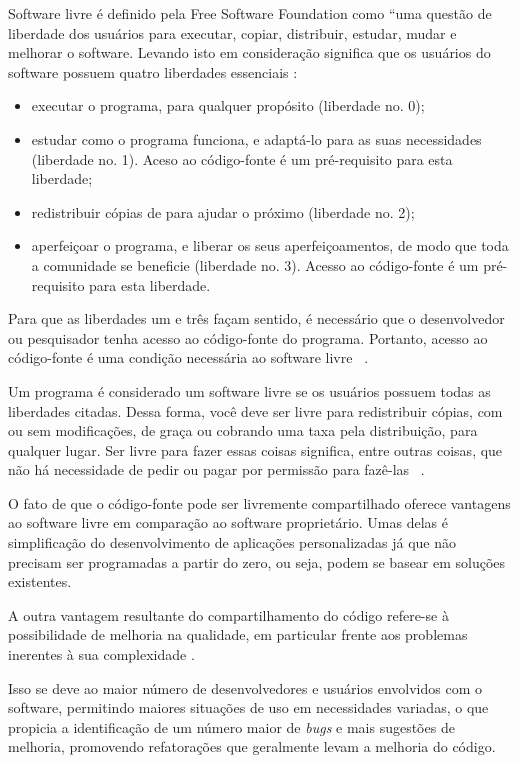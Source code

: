 Software livre é definido pela Free Software Foundation como “uma questão de liberdade dos usuários para executar, copiar, distribuir, estudar, mudar e melhorar o software. Levando isto em consideração significa que os usuários do software possuem quatro liberdades essenciais \cite{stallman2002free}:

\begin{itemize}
\item executar o programa, para qualquer propósito (liberdade no. 0);
\item estudar como o programa funciona, e adaptá-lo para as suas necessidades (liberdade no. 1). Aceso ao código-fonte é um pré-requisito para esta liberdade;
\item redistribuir cópias de para ajudar o próximo (liberdade no. 2);
\item aperfeiçoar o programa, e liberar os seus aperfeiçoamentos, de modo que toda a comunidade se beneficie (liberdade no. 3). Acesso ao código-fonte é um pré-requisito para esta liberdade.
\end{itemize}

Para que as liberdades um e três façam sentido, é necessário que o desenvolvedor ou pesquisador tenha acesso ao código-fonte do programa.  Portanto, acesso ao código-fonte é uma condição necessária ao software livre ~\cite{gnu2013}.

Um programa é considerado um software livre se os usuários possuem todas as liberdades citadas. Dessa forma, você deve ser livre para redistribuir cópias, com ou sem modificações, de graça ou cobrando uma taxa pela distribuição, para qualquer lugar. Ser livre para fazer essas coisas significa, entre outras coisas, que não há necessidade de pedir ou pagar por permissão para fazê-las ~\cite{anaPaula2012}.

O fato de que o código-fonte pode ser livremente compartilhado oferece vantagens ao software livre em comparação ao software proprietário. Umas delas é simplificação do desenvolvimento de aplicações personalizadas já que não precisam ser programadas a partir do zero, ou seja, podem se basear em soluções existentes.

A outra vantagem resultante do compartilhamento do código refere-se à possibilidade de melhoria na qualidade, em particular frente aos problemas inerentes à sua complexidade \cite{catedralBazzar}.

Isso se deve ao maior número de desenvolvedores e usuários envolvidos com o software, permitindo maiores situações de uso em necessidades variadas, o que propicia a identificação de um número maior de \emph{bugs} e mais sugestões de melhoria, promovendo refatorações que geralmente levam a melhoria do código.

